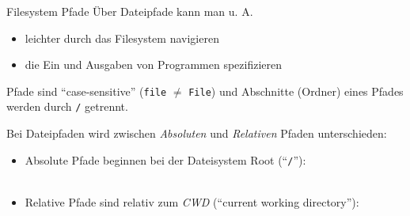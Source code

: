 \documentclass{setbeamer}
\begin{document}
\begin{frame}{Filesystem Pfade}
    Über Dateipfade kann man u. A.
    \begin{itemize}
        \item leichter durch das Filesystem navigieren
        \item die Ein und Ausgaben von Programmen spezifizieren
    \end{itemize}

    \vspace{0.3cm}

    Pfade sind ``case-sensitive'' (\texttt{file} \(\ne\) \texttt{File}) und Abschnitte (Ordner) eines Pfades werden durch \texttt{/} getrennt.

    \vspace{0.3cm}

    Bei Dateipfaden wird zwischen \emph{Absoluten} und \emph{Relativen} Pfaden unterschieden:
    \begin{itemize}
        \item Absolute Pfade beginnen bei der Dateisystem Root (``\texttt{/}''):\\\
        \item Relative Pfade sind relativ zum \emph{CWD} (``current working directory''):\\
    \end{itemize}
\end{frame}
\end{document}
